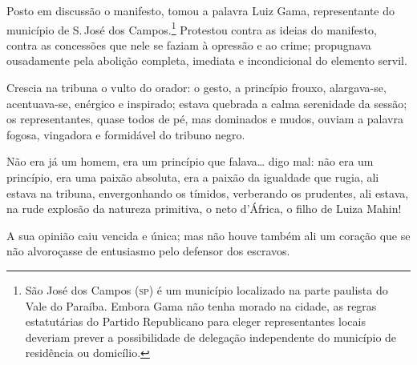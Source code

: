 Posto em discussão o manifesto, tomou a palavra Luiz Gama, representante
do município de S.\,José dos Campos.\footnote{São José dos Campos (\textsc{sp})
  é um município localizado na parte paulista do Vale do Paraíba. Embora
  Gama não tenha morado na cidade, as regras estatutárias do Partido
  Republicano para eleger representantes locais deveriam prever a
  possibilidade de delegação independente do município de residência ou
  domicílio.} Protestou contra as ideias do manifesto, contra as
concessões que nele se faziam à opressão e ao crime; propugnava
ousadamente pela abolição completa, imediata e incondicional do elemento
servil.

Crescia na tribuna o vulto do orador: o gesto, a princípio frouxo,
alargava-se, acentuava-se, enérgico e inspirado; estava quebrada a calma
serenidade da sessão; os representantes, quase todos de pé, mas
dominados e mudos, ouviam a palavra fogosa, vingadora e formidável do
tribuno negro.

Não era já um homem, era um princípio que falava\ldots{} digo mal: não era um
princípio, era uma paixão absoluta, era a paixão da igualdade que rugia,
ali estava na tribuna, envergonhando os tímidos, verberando os
prudentes, ali estava, na rude explosão da natureza primitiva, o neto
d'África, o filho de Luiza Mahin!

A sua opinião caiu vencida e única; mas não houve também ali um coração
que se não alvoroçasse de entusiasmo pelo defensor dos escravos.

